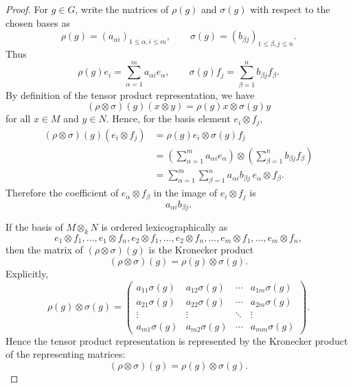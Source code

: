 \begin{proof}
    For \(g\in G\), write the matrices of \(\rho(g)\) and \(\sigma(g)\) with respect
    to the chosen bases as
    \[
        \rho(g)=(a_{\alpha i})_{1\leq \alpha,i\leq m},
        \qquad
        \sigma(g)=(b_{\beta j})_{1\leq \beta,j\leq n}.
    \]
    Thus
    \[
        \rho(g)e_i=\sum_{\alpha=1}^m a_{\alpha i}e_\alpha,
        \qquad
        \sigma(g)f_j=\sum_{\beta=1}^n b_{\beta j}f_\beta.
    \]
    By definition of the tensor product representation, we have
    \[
        (\rho\otimes\sigma)(g)(x\otimes y)
        =
        \rho(g)x\otimes \sigma(g)y
    \]
    for all \(x\in M\) and \(y\in N\). Hence, for the basis element
    \(e_i\otimes f_j\),
    \[
    \begin{aligned}
        (\rho\otimes\sigma)(g)(e_i\otimes f_j)
        &= \rho(g)e_i\otimes \sigma(g)f_j  \\
        &=
        \left(\sum_{\alpha=1}^m a_{\alpha i}e_\alpha\right)
        \otimes
        \left(\sum_{\beta=1}^n b_{\beta j}f_\beta\right) \\
        &=
        \sum_{\alpha=1}^m\sum_{\beta=1}^n
        a_{\alpha i}b_{\beta j}
        \,e_\alpha\otimes f_\beta .
    \end{aligned}
    \]
    Therefore the coefficient of \(e_\alpha\otimes f_\beta\) in the image of
    \(e_i\otimes f_j\) is
    \[
        a_{\alpha i}b_{\beta j}.
    \]

    If the basis of \(M\otimes_k N\) is ordered lexicographically as
    \[
        e_1\otimes f_1,\dots,e_1\otimes f_n,
        e_2\otimes f_1,\dots,e_2\otimes f_n,
        \dots,
        e_m\otimes f_1,\dots,e_m\otimes f_n,
    \]
    then the matrix of \((\rho\otimes\sigma)(g)\) is the Kronecker product
    \[
        (\rho\otimes\sigma)(g)
        =
        \rho(g)\otimes \sigma(g).
    \]
    Explicitly,
    \[
        \rho(g)\otimes \sigma(g)
        =
        \begin{pmatrix}
            a_{11}\sigma(g) & a_{12}\sigma(g) & \cdots & a_{1m}\sigma(g) \\
            a_{21}\sigma(g) & a_{22}\sigma(g) & \cdots & a_{2m}\sigma(g) \\
            \vdots          & \vdots          & \ddots & \vdots          \\
            a_{m1}\sigma(g) & a_{m2}\sigma(g) & \cdots & a_{mm}\sigma(g)
        \end{pmatrix}.
    \]
    Hence the tensor product representation is represented by the Kronecker product
    of the representing matrices:
    \[
        (\rho\otimes\sigma)(g)=\rho(g)\otimes\sigma(g).
    \]
\end{proof}

